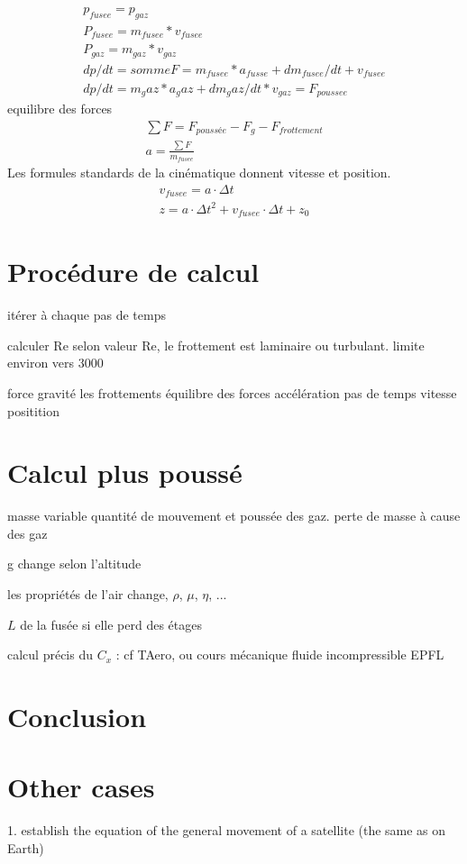 \documentclass[12pt,a4paper]{article}
\begin{document}
\begin{eqnarray}
p_{fusee}=p_{gaz}\\
P_{fusee}=m_{fusee}*v_{fusee}\\
P_{gaz}=m_{gaz}*v_{gaz}\\
dp/dt=somme F=m_{fusee}*a_{fusse}+ d m_{fusee}/dt+v_{fusee}\\
dp/dt=m_gaz*a_gaz+d m_gaz/dt*v_{gaz}=F_{poussee}
\end{eqnarray}
equilibre des forces
\begin{eqnarray}
\sum F=F_{poussée}-F_g-F_{frottement}\\
a=\frac{\sum F}{m_{fusee}}
\end{eqnarray}
Les formules standards de la cinématique donnent vitesse et position. 
\begin{eqnarray}
v_{fusee}=a \cdot \Delta t\\
z=a \cdot \Delta t^2+v_{fusee} \cdot \Delta t+z_0
\end{eqnarray}
\section{Procédure de calcul}

itérer à chaque pas de temps

calculer Re
selon valeur Re, le frottement est laminaire ou turbulant. limite environ vers 3000

force gravité
les frottements
équilibre des forces
accélération
pas de temps
vitesse 
positition

\section{Calcul plus poussé}
masse variable
quantité de mouvement et poussée des gaz. perte de masse à cause des gaz

g change selon l'altitude

les propriétés de l'air change, $\rho$, $\mu$, $\eta$, ...

$L$ de la fusée si elle perd des étages

calcul précis du $C_x$ : cf TAero, ou cours mécanique fluide incompressible EPFL
\section{Conclusion}

\section{Other cases}
1. establish the equation of the general movement of a satellite (the same as on Earth)
\end{document}
